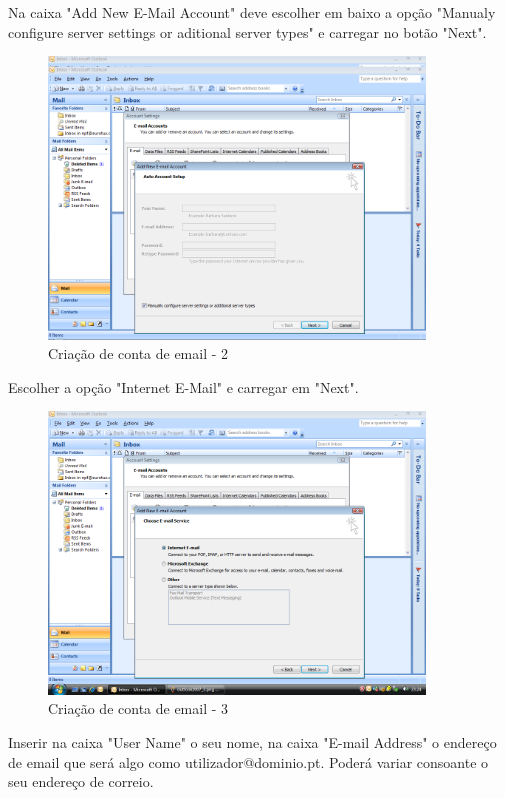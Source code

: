 Na caixa "Add New E-Mail Account" deve escolher em baixo a opção "Manualy configure server settings or aditional server types" e carregar no botão "Next".

\begin{figure}[H]
    \begin{center}
        \includegraphics[width=10cm]{include/img/outlook2007_3}
    \end{center}
    \caption{Criação de conta de email - 2}
    \label{fig:OUTLK2k733}
\end{figure}

Escolher a opção "Internet E-Mail" e carregar em "Next".

\begin{figure}[H]
    \begin{center}
        \includegraphics[width=10cm]{include/img/outlook2007_4}
    \end{center}
    \caption{Criação de conta de email - 3}
    \label{fig:OUTLK2k74}
\end{figure}

Inserir na caixa "User Name" o seu nome, na caixa "E-mail Address" o endereço de email que será algo como utilizador@dominio.pt. Poderá variar consoante o seu endereço de correio.

